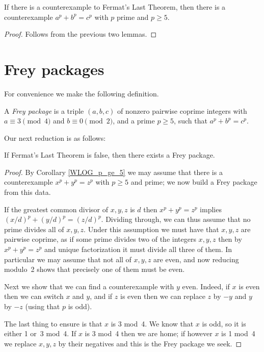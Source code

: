 \begin{corollary}\label{WLOG_p_ge_5}\leanok If there is a counterexample to Fermat's Last Theorem, then there is a counterexample $a^p+b^p=c^p$ with $p$ prime and $p\geq 5$.
\end{corollary}
\begin{proof}\leanok Follows from the previous two lemmas.\end{proof}

\section{Frey packages}

For convenience we make the following definition.

\begin{definition}\label{Frey_package}\leanok A \emph{Frey package} is a triple $(a,b,c)$ of nonzero pairwise coprime integers with $a\equiv3\pmod4$ and $b\equiv0\pmod2$, and a prime $p\geq5$, such that $a^p+b^p=c^p$.\end{definition}

Our next reduction is as follows:

\begin{lemma}\label{Frey_package_of_FLT_counterex}\leanok
  If Fermat's Last Theorem is false, then there exists a Frey package.
\end{lemma}
\begin{proof} By Corollary \ref{WLOG_p_ge_5} we may assume that there is a counterexample $x^p+y^p=z^p$ with $p\geq 5$ and prime; we now build a Frey package from this data.
  
  If the greatest common divisor of $x,y,z$ is $d$ then $x^p+y^p=z^p$ implies $(x/d)^p+(y/d)^p=(z/d)^p$. Dividing through, we can thus assume that no prime divides all of $x,y,z$. Under this assumption we must have that $x,y,z$ are pairwise coprime, as if some prime divides two of the integers $x,y,z$ then by $x^p+y^p=z^p$ and unique factorization it must divide all three of them. In particular we may assume that not all of $x,y,z$ are even, and now reducing modulo~2 shows that precisely one of them must be even. 
  
  Next we show that we can find a counterexample with $y$ even. Indeed, if $x$ is even then we can switch $x$ and $y$, and if $z$ is even then we can replace $z$ by $-y$ and $y$ by $-z$ (using that $p$ is odd).

  The last thing to ensure is that $x$ is 3 mod~4. We know that $x$ is odd, so it is either 1 or~3 mod~4. If $x$ is 3 mod~4 then we are home; if however $x$ is 1 mod~4 we replace $x,y,z$ by their negatives and this is the Frey package we seek.
\end{proof}

